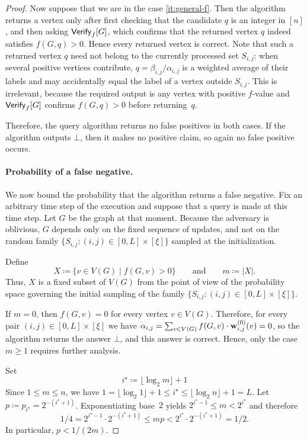 \begin{proof}
Now suppose that we are in the case \ref{it:general-f}.
Then the algorithm returns a vertex only after first checking that the candidate $q$ is an integer in $[n]$, and then asking $\mathsf{Verify}_f[G]$, which confirms that the returned vertex $q$ indeed satisfies $f(G,q)>0$.
Hence every returned vertex is correct.
Note that such a returned vertex $q$ need not belong to the currently processed set $S_{i,j}$: when several positive vertices contribute, $q=\beta_{i,j}/\alpha_{i,j}$ is a weighted average of their labels and may accidentally equal the label of a vertex outside $S_{i,j}$.
This is irrelevant, because the required output is any vertex with positive $f$-value and $\mathsf{Verify}_f[G]$ confirms $f(G,q)>0$ before returning~$q$.

Therefore, the query algorithm returns no false positives in both cases.
If the algorithm outputs $\bot$, then it makes no positive claim, so again no false positive occurs.

\paragraph*{Probability of a false negative.} We now bound the probability that the algorithm returns a false negative.
Fix an arbitrary time step of the execution and suppose that a query is made at this time step.
Let $G$ be the graph at that moment.
Because the adversary is oblivious, $G$ depends only on the fixed sequence of updates, and not on the random family $\{S_{i,j}\colon (i,j)\in [0,L]\times [\xi]\}$ sampled at the initialization.

Define \[X\coloneqq \{v\in V(G)\mid f(G,v)>0\}\qquad\textrm{and}\qquad m\coloneqq |X|.\]
Thus, $X$ is a fixed subset of $V(G)$ from the point of view of the probability space governing the initial sampling of the family $\{S_{i,j}\colon (i,j)\in [0,L]\times [\xi]\}$.

If $m=0$, then $f(G,v)=0$ for every vertex $v\in V(G)$.
Therefore, for every pair $(i,j)\in [0,L]\times [\xi]$ we have $\alpha_{i,j}=\sum_{v\in V(G)} f(G,v)\cdot \mathbf{w}^{(0)}_{i,j}(v)=0$, so the algorithm returns the answer $\bot$, and this answer is correct.
Hence, only the case $m\ge 1$ requires further analysis.


Set \[i^\star\coloneqq \lfloor \log_2 m\rfloor + 1\]
Since $1\le m\le n$, we have $1=\lfloor \log_2 1\rfloor + 1 \le i^\star \le \lfloor \log_2 n\rfloor + 1 = L$.
Let $p\coloneqq p_{i^\star}=2^{-(i^\star+1)}$.
Exponentiating base~$2$ yields $2^{i^\star-1}\le m < 2^{i^\star}$ and therefore \[1/4 = 2^{i^\star-1}\cdot 2^{-(i^\star+1)} \le mp < 2^{i^\star}\cdot 2^{-(i^\star+1)} = 1/2.\]
In particular, $p < 1/(2m)$.


\end{proof}
